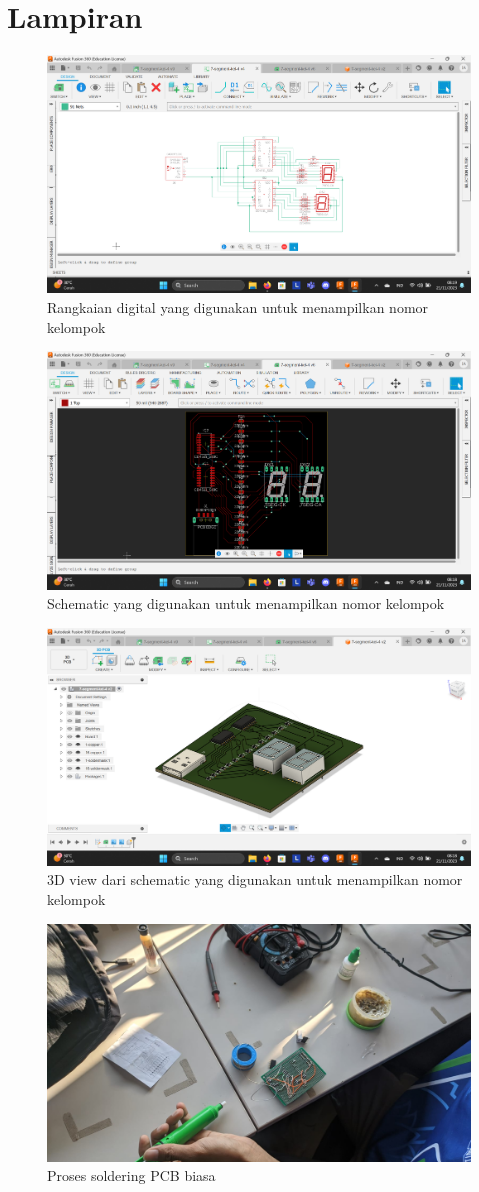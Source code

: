 \section*{Lampiran} %

\begin{figure}[h]
  \centering
  \includegraphics[width=0.45\linewidth]{img/raw-circuit.png}
  \caption{Rangkaian digital yang digunakan untuk menampilkan nomor kelompok} 
  \label{fig:raw-circuit}
\end{figure}

\begin{figure}[h]
  \centering
  \includegraphics[width=0.5\linewidth]{img/wired-schematic.png}
  \caption{Schematic yang digunakan untuk menampilkan nomor kelompok} 
  \label{fig:wired-schematic}
\end{figure}

\begin{figure}[h]
  \centering
  \includegraphics[width=0.5\linewidth]{img/3d-7segment.png}
  \caption{3D view dari schematic yang digunakan untuk menampilkan nomor kelompok} 
  \label{fig:3d-schematic}
\end{figure}

\begin{figure}[h]
  \centering
  \includegraphics[width=0.8\linewidth]{img/soldering-ce.jpeg}
  \caption{Proses soldering PCB biasa} 
  \label{fig:soldering-ce}
\end{figure}

